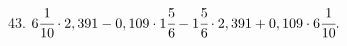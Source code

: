 43. $6\cfrac{1}{10}\cdot2,391-0,109\cdot1\cfrac{5}{6}-1\cfrac{5}{6}\cdot2,391+0,109\cdot6\cfrac{1}{10}.$\\
